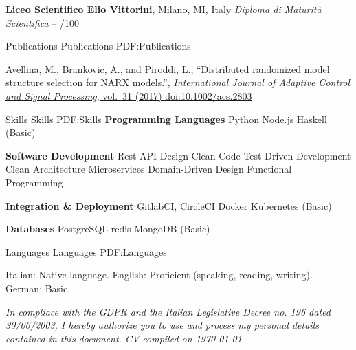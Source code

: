 \documentclass[a4paper,MMMyyyy,nonstopmode]{simpleresumecv}
\newcommand{\CVNote}{In compliace with the GDPR and the Italian Legislative Decree no. 196 dated 30/06/2003, I hereby authorize you to use and process my personal details contained in this document. CV compiled on {\today}}
\newcommand{\DoubleBigGap}{\BigGap\BigGap}
\begin{document}
\begin{Body}
      \DoubleBigGap

      \Entry
        \href{https://www.eliovittorini.edu.it/}{\textbf{Liceo Scientifico Elio Vittorini}, Milano, MI, Italy}
        \Gap
        \textit{Diploma di Maturità Scientifica}
          \hfill
           -- 
        /100

    \Section
    {Publications}
    {Publications}
    {PDF:Publications}

    \href{https://doi.org/10.1002/acs.2803}
    {\underline{Avellina, M.}, Brankovic, A., and Piroddi, L.,
    ``Distributed randomized model structure selection for NARX models.'',
    \textit{International Journal of Adaptive Control and Signal Processing},
    vol.~31
    (2017)
    doi:10.1002/acs.2803}


    \newpage

    \Section
    {Skills}
    {Skills}
    {PDF:Skills}
      \Entry
        \textbf{Programming Languages}
        \Gap
        \BulletItem
          Python
        \BulletItem
          Node.js
        \BulletItem
          Haskell (Basic)

      \BigGap

      \Entry
        \textbf{Software Development}
        \Gap
        \BulletItem
          Rest API Design
        \BulletItem
          Clean Code
        \BulletItem
          Test-Driven Development
        \BulletItem
          Clean Architecture
        \BulletItem
          Microservices
        \BulletItem
          Domain-Driven Design
        \BulletItem
          Functional Programming

      \BigGap

      \Entry
        \textbf{Integration \& Deployment}
        \Gap
        \BulletItem
          GitlabCI, CircleCI
        \BulletItem
          Docker
        \BulletItem
          Kubernetes (Basic)

      \BigGap

      \Entry
        \textbf{Databases}
        \Gap
        \BulletItem
          PostgreSQL
        \BulletItem
          redis
        \BulletItem
          MongoDB (Basic)


    \Section
    {Languages}
    {Languages}
    {PDF:Languages}

      \Entry
        Italian: Native language.
      \Gap
      \Entry
        English: Proficient (speaking, reading, writing).
      \Gap
      \Entry
        German: Basic.

  \end{Body}

  \DoubleBigGap
  \UseNoteFont
  \null
  \textit{\CVNote}
\end{document}
